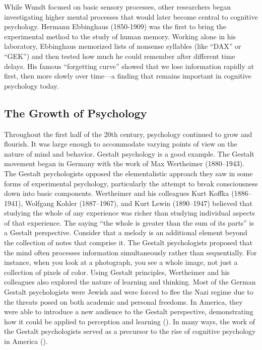 \documentclass[
]{krantz}
\begin{document}
While Wundt focused on basic sensory processes, other researchers began investigating higher mental processes that would later become central to cognitive psychology. Hermann Ebbinghaus (1850-1909) was the first to bring the experimental method to the study of human memory. Working alone in his laboratory, Ebbinghaus memorized lists of nonsense syllables (like ``DAX'' or ``GEK'') and then tested how much he could remember after different time delays. His famous ``forgetting curve'' showed that we lose information rapidly at first, then more slowly over time---a finding that remains important in cognitive psychology today.

\subsection*{The Growth of Psychology}\label{the-growth-of-psychology}


Throughout the first half of the 20th century, psychology continued to grow and flourish. It was large enough to accommodate varying points of view on the nature of mind and behavior. Gestalt psychology is a good example. The Gestalt movement began in Germany with the work of Max Wertheimer (1880--1943). The Gestalt psychologists opposed the elementalistic approach they saw in some forms of experimental psychology, particularly the attempt to break consciousness down into basic components. Wertheimer and his colleagues Kurt Koffka (1886--1941), Wolfgang Kohler (1887--1967), and Kurt Lewin (1890--1947) believed that studying the whole of any experience was richer than studying individual aspects of that experience. The saying ``the whole is greater than the sum of its parts'' is a Gestalt perspective. Consider that a melody is an additional element beyond the collection of notes that comprise it. The Gestalt psychologists proposed that the mind often processes information simultaneously rather than sequentially. For instance, when you look at a photograph, you see a whole image, not just a collection of pixels of color. Using Gestalt principles, Wertheimer and his colleagues also explored the nature of learning and thinking. Most of the German Gestalt psychologists were Jewish and were forced to flee the Nazi regime due to the threats posed on both academic and personal freedoms. In America, they were able to introduce a new audience to the Gestalt perspective, demonstrating how it could be applied to perception and learning (). In many ways, the work of the Gestalt psychologists served as a precursor to the rise of cognitive psychology in America ().
\end{document}
